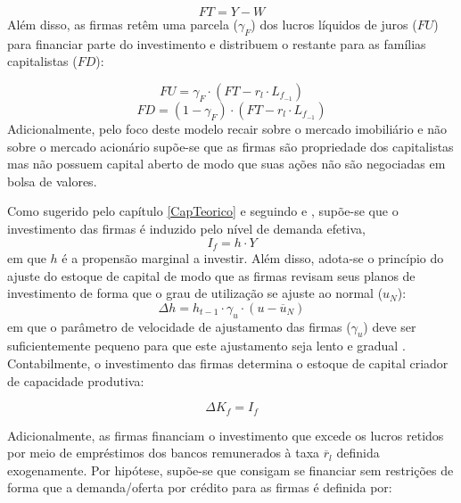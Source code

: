 \begin{equation}
    FT = Y - W
\end{equation}
Além disso, as firmas retêm uma parcela ($\gamma_F$) dos lucros líquidos de juros ($FU$) para financiar parte do investimento e distribuem o restante para as famílias capitalistas ($FD$):

\begin{equation}
    FU = \gamma_F\cdot (FT - r_l\cdot L_{f_{-1}})
\end{equation}
\begin{equation}
    FD = (1-\gamma_F)\cdot (FT - r_l\cdot L_{f_{-1}})
\end{equation}
Adicionalmente, pelo foco deste modelo recair sobre o mercado imobiliário e não sobre o mercado acionário supõe-se que as firmas são propriedade dos capitalistas mas não possuem capital aberto de modo que suas ações não são negociadas em bolsa de valores.

Como sugerido pelo capítulo \ref{CapTeorico} e seguindo \textcite{serrano_long_1995} e \textcite{serrano_sraffian_2017}, supõe-se que o investimento das firmas é induzido pelo nível de demanda efetiva,
\begin{equation}
\label{_If}
    I_f = h\cdot Y
\end{equation}
em que $h$ é a propensão marginal a investir. Além disso, adota-se o princípio do ajuste do estoque de capital de modo que as firmas revisam seus planos de investimento de forma que o grau de utilização se ajuste ao normal ($u_N$):
\begin{equation}
\label{_h}
    \Delta h = h_{t-1}\cdot \gamma_u\cdot (u - \overline{u}_N)
\end{equation}
em que o parâmetro de velocidade de ajustamento das firmas ($\gamma_u$) deve ser suficientemente pequeno para que este ajustamento seja lento e gradual \cite[p.~271]{freitas_growth_2015}. Contabilmente, o investimento das firmas determina o estoque de capital criador de capacidade produtiva:

\begin{equation}
    \Delta K_f = I_f
\end{equation}

Adicionalmente, as firmas financiam o investimento que excede os lucros retidos por meio de empréstimos dos bancos remunerados à taxa $\overline r_l$ definida exogenamente. Por hipótese, supõe-se que consigam se financiar sem restrições de forma que a demanda/oferta por crédito para as firmas é definida por:


